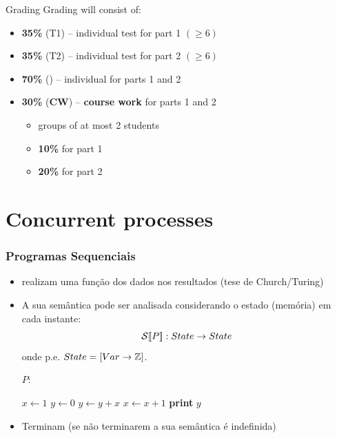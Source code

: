 \documentclass[aspectratio=169]{beamer}
\begin{document}
\begin{frame}{Grading}
  Grading will consist of:
  \begin{itemize}
  \item \textbf{35\%} (\alert{T1}) -- individual \alert{test} for part 1 $(\geq 6)$
  \item \textbf{35\%} (\alert{T2}) -- individual \alert{test} for part 2 $(\geq 6)$
  \item \textbf{70\%} () -- individual  for parts 1 and 2
  \item \textbf{30\%} (\textbf{CW}) -- \textbf{course work} for parts 1 and 2
    \begin{itemize}
      \item groups of at most 2 students
      \item \textbf{10\%} for part 1
      \item \textbf{20\%} for part 2
    \end{itemize}
  \end{itemize}

\end{frame}



\section{Concurrent processes}


\begin{frame}
\frametitle{Programas Sequenciais}
\begin{itemize}
  \item realizam uma função dos dados nos resultados (tese de Church/Turing)

\item A sua semântica pode ser analisada considerando o estado (memória) em cada instante:
$${\cal S}[\![ P]\!]: State \rightarrow State$$
onde p.e. $State=[Var \rightarrow \mathbb{Z}]$.

$P:$
\begin{algorithmic}
\State $x\gets 1$
\State $y\gets 0$
\State $y \gets y+x$
\State $x \gets x+1$
\EndWhile
\State \textbf{print} $y$
\end{algorithmic} 
\item Terminam (se não terminarem a sua semântica é indefinida)
\end{itemize} 
\end{frame}
\end{document}
